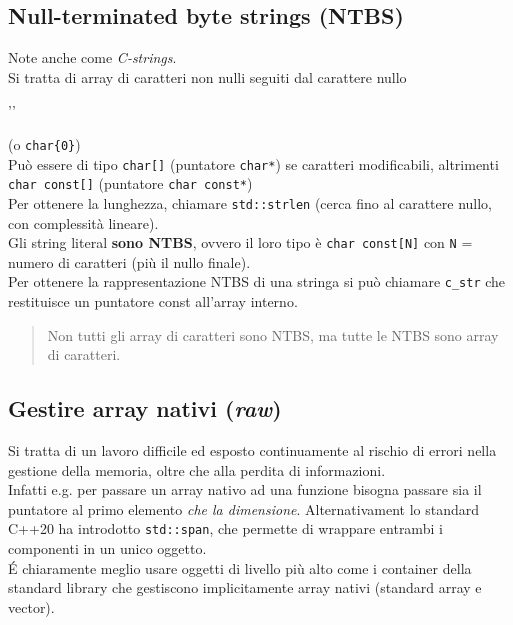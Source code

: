 \documentclass[10pt, oneside]{book}
\begin{document}
\subsection{Null-terminated byte strings (NTBS)}
Note anche come \textit{C-strings}.\\
Si tratta di array di caratteri non nulli seguiti dal carattere nullo \begin{verb} '\0' \end{verb} (o \texttt{char\{0\}})\\
Può essere di tipo \texttt{char[]} (puntatore \texttt{char*}) se caratteri modificabili, altrimenti \texttt{char const[]} (puntatore \texttt{char const*})\\
Per ottenere la lunghezza, chiamare \texttt{std::strlen} (cerca fino al carattere nullo, con complessità lineare).\\Gli string literal \textbf{sono NTBS}, ovvero il loro tipo è \texttt{char const[N]} con \texttt{N} = numero di caratteri (più il nullo finale).\\
Per ottenere la rappresentazione NTBS di una stringa si può chiamare \texttt{c\_str} che restituisce un puntatore const all'array interno.
\begin{quote}
Non tutti gli array di caratteri sono NTBS, ma tutte le NTBS sono array di caratteri.
\end{quote}

\subsection{Gestire array nativi (\textit{raw})}
Si tratta di un lavoro difficile ed esposto continuamente al rischio di errori nella gestione della memoria, oltre che alla perdita di informazioni.\\
Infatti e.g. per passare un array nativo ad una funzione bisogna passare sia il puntatore al primo elemento \textit{che la dimensione}. Alternativament lo standard C++20 ha introdotto \texttt{std::span}, che permette di wrappare entrambi i componenti in un unico oggetto.\\
\'E chiaramente meglio usare oggetti di livello più alto come i container della standard library che gestiscono implicitamente array nativi (standard array e vector).
\end{document}
